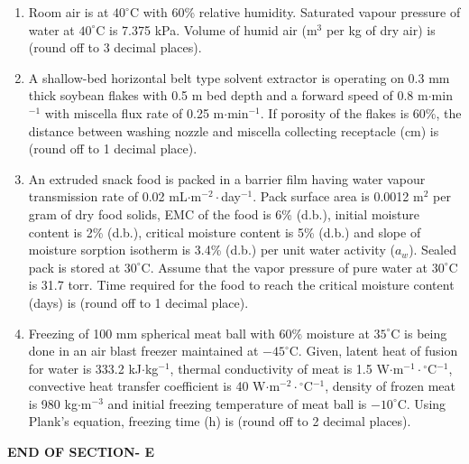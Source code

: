 \documentclass[journal,12pt,onecolumn]{IEEEtran}
\begin{document}
\begin{enumerate}[label=\arabic*)]
\vspace{0.5cm}

\item Room air is at $40^\circ$C with 60\% relative humidity. Saturated vapour pressure of water at $40^\circ$C is 7.375 kPa. Volume of humid air (m$^{3}$ per kg of dry air) is \underline{\hspace{2cm}} (round off to 3 decimal places).
\vspace{0.05cm}
\hfill{} \\

\newpage

\item A shallow-bed horizontal belt type solvent extractor is operating on 0.3 mm thick soybean flakes with 0.5 m bed depth and a forward speed of 0.8 m$\cdot$min$^{-1}$ with miscella flux rate of 0.25 m$\cdot$min$^{-1}$. If porosity of the flakes is 60\%, the distance between washing nozzle and miscella collecting receptacle (cm) is \underline{\hspace{2cm}} (round off to 1 decimal place).
\hfill{} \\

\vspace{0.5cm}

\item An extruded snack food is packed in a barrier film having water vapour transmission rate of 0.02 mL$\cdot$m$^{-2}\cdot$day$^{-1}$. Pack surface area is 0.0012 m$^{2}$ per gram of dry food solids, EMC of the food is 6\% (d.b.), initial moisture content is 2\% (d.b.), critical moisture content is 5\% (d.b.) and slope of moisture sorption isotherm is 3.4\% (d.b.) per unit water activity ($a_w$). Sealed pack is stored at $30^\circ$C. Assume that the vapor pressure of pure water at $30^\circ$C is 31.7 torr. Time required for the food to reach the critical moisture content (days) is \underline{\hspace{2cm}} (round off to 1 decimal place).
\hfill{} \\

\vspace{0.5cm}

\item Freezing of 100 mm spherical meat ball with 60\% moisture at $35^\circ$C is being done in an air blast freezer maintained at $-45^\circ$C. Given, latent heat of fusion for water is 333.2 kJ$\cdot$kg$^{-1}$, thermal conductivity of meat is 1.5 W$\cdot$m$^{-1}\cdot{}^\circ$C$^{-1}$, convective heat transfer coefficient is 40 W$\cdot$m$^{-2}\cdot{}^\circ$C$^{-1}$, density of frozen meat is 980 kg$\cdot$m$^{-3}$ and initial freezing temperature of meat ball is $-10^\circ$C. Using Plank's equation, freezing time (h) is \underline{\hspace{2cm}} (round off to 2 decimal places).
\hfill{} \\

\vspace{0.5cm}

\end{enumerate}

\vspace{3\baselineskip}
\begin{center}
    \item[\textbf{END OF SECTION- E}]
\end{center}
\end{document}
